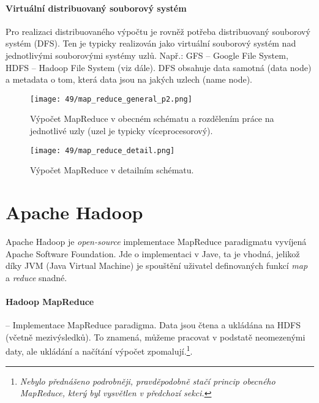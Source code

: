 \paragraph*{Virtuální distribuovaný souborový systém} Pro realizaci distribuovaného výpočtu je rovněž potřeba distribuovaný souborový systém (DFS). Ten je typicky realizován jako virtuální souborový systém nad jednotlivými souborovými systémy uzlů. Např.: GFS -- Google File System, HDFS -- Hadoop File System (viz dále). DFS obsahuje data samotná (data node) a metadata o tom, která data jsou na jakých uzlech (name node).

\begin{figure}[H]
    \centering
    \texttt{[image: 49/map\_reduce\_general\_p2.png]}
    \caption{Výpočet MapReduce v obecném schématu a rozdělením práce na jednotlivé uzly (uzel je typicky víceprocesorový).}
\end{figure}

\begin{figure}[H]
    \centering
    \texttt{[image: 49/map\_reduce\_detail.png]}
    \caption{Výpočet MapReduce v detailním schématu.}
\end{figure}


\section{Apache Hadoop}


Apache Hadoop je \textit{open-source} implementace MapReduce paradigmatu vyvíjená Apache Software Foundation. Jde o implementaci v Jave, ta je vhodná, jelikož díky JVM (Java Virtual Machine) je spouštění uživatel definovaných funkcí \textit{map} a \textit{reduce} snadné.

\paragraph*{Hadoop MapReduce} -- Implementace MapReduce paradigma. Data jsou čtena a ukládána na HDFS (včetně mezivýsledků). To znamená, můžeme pracovat v podstatě neomezenými daty, ale ukládání a načítání výpočet zpomalují.\footnote{\textit{Nebylo přednášeno podrobněji, pravděpodobně stačí princip obecného MapReduce, který byl vysvětlen v předchozí sekci.}}.

